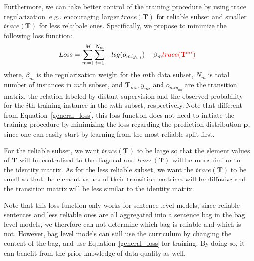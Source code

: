 Furthermore, we can take better control of the training procedure by using trace regularization, e.g., encouraging larger $trace(\mathbf{T})$ for reliable subset and smaller $trace(\mathbf{T})$ for less relaibale ones. 
Specifically, we propose to minimize the following  loss function:
%
\begin{equation}
\begin{aligned}
Loss=\sum_{m=1}^M{\sum_{i=1}^{N_m}{-log(o_{miy_{mi}})}} + \beta_m \textcolor{red}{trace(\mathbf{T}^{mi})}
\end{aligned}
\end{equation}
where, $\beta_m$ is the regularization weight for the $m$th data subset, $N_m$ is total number of instances in $m$th subset, and  $\mathbf{T}_{mi}$, $y_{mi}$ and $o_{miy_{mi}}$ are the transition matrix, the relation labeled by distant supervision and the observed probability for the $i$th training instance in the $m$th subset, respectively. Note that different from Equation~\ref{general_loss}, this loss function does not need to initiate the training procedure by 
minimizing the loss regarding the prediction distribution $\mathbf{p}$, since one can easily start by learning from the most reliable split first. 

For the reliable subset, we want $trace(\mathbf{T})$ to be large   so that the element values of $\mathbf{T}$ will be centralized to the diagonal and $trace(\mathbf{T})$ will be more similar to the identity matrix. As for the  less reliable subset, we want the $trace(\mathbf{T})$ to be small  so that the element values of their transition matrices will be diffusive and the transition matrix will be less similar to the identity matrix. 

Note that this loss function only works for sentence level models, since reliable sentences and less reliable ones are all aggregated into a sentence bag in the bag level models,  we therefore can not determine which bag is reliable and which is not. However, bag level models can still use the curriculum by changing the content of the bag,   and use Equation~\ref{general_loss} for training. By doing so, it can benefit from the prior knowledge of data quality as well.



